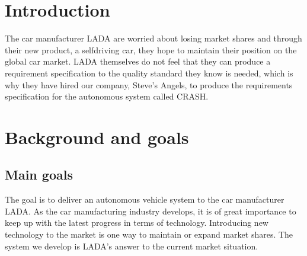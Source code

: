 \documentclass{article}
\begin{document}

\titleformat{\subsubsection}[runin]{\large\bfseries}{}{0pt}{#1\quad\thesubsubsection}


\begingroup
\hypersetup{linkcolor=black}
\tableofcontents
\thispagestyle{empty}
\endgroup
\newpage
\begingroup
\hypersetup{linkcolor=black}
\listoffigures
\thispagestyle{empty}
\endgroup
\newpage
{}

\section{Introduction}
The car manufacturer LADA are worried about losing market shares and through their new product, a selfdriving car, they hope to maintain their position on the global car market. LADA themselves do not feel that they can produce a requirement specification to the quality standard they know is needed, which is why they have hired our company, Steve's Angels, to produce the requirements specification for the autonomous system called CRASH. 

\section{Background and goals}
\subsection{Main goals}
The goal is to deliver an autonomous vehicle system to the car manufacturer LADA. As the car manufacturing industry develops, it is of great importance to keep up with the latest progress in terms of technology. Introducing new technology to the market is one way to maintain or expand market shares. The system we develop is LADA's answer to the current market situation.
\end{document}
